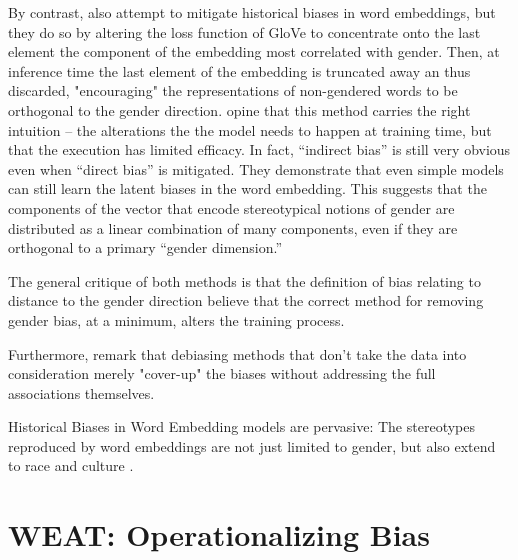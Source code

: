 \documentclass[11pt,a4paper]{article}
\begin{document}
By contrast, \citet{zhao2018learning} also attempt to mitigate historical biases
in word embeddings, but they do so by altering the loss function of GloVe to
concentrate onto the last element the component of the embedding most correlated
with gender. Then, at inference time the last element of the embedding is
truncated away an thus discarded, "encouraging" the representations of
non-gendered words to be orthogonal to the gender direction.
\citet{lipstick-1903-03862} opine that this method carries the right intuition
-- the alterations the the model needs to happen at training time, but that the
execution has limited efficacy. In fact, ``indirect bias'' is still very obvious
even when ``direct bias'' is mitigated. They demonstrate that even simple models
can still learn the latent biases in the word embedding. This suggests that the
components of the vector that encode stereotypical notions of gender are
distributed as a linear combination of many components, even if they are
orthogonal to a primary ``gender dimension.''


The general critique of both methods is that the definition of bias relating to
distance to the gender direction \citet{lipstick-1903-03862} believe that the
correct method for removing gender bias, at a minimum, alters the training
process.

Furthermore, \citet{lipstick-1903-03862} remark that debiasing methods that
don't take the data into consideration merely "cover-up" the biases without
addressing the full associations themselves.

Historical Biases in Word Embedding models are pervasive:
The stereotypes reproduced by word embeddings are not just limited to gender,
but also extend to race and culture \citep{caliskan2017semantics}.

\section{WEAT: Operationalizing Bias}
\end{document}
